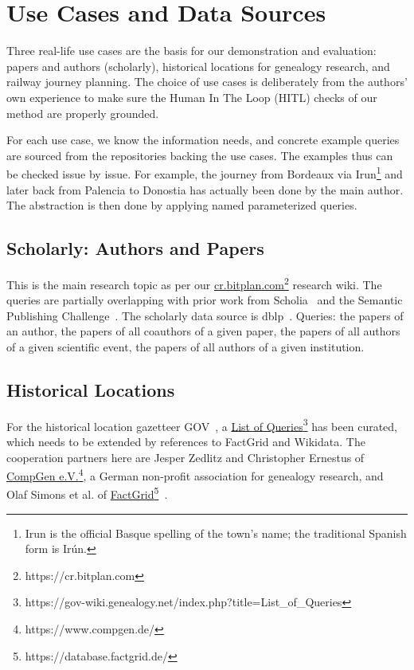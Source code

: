 \documentclass[
]{ceurart}
\newcommand{\footnotelink}[2]{\href{#1}{#2}\footnote{#1}}
\begin{document}
\section{Use Cases and Data Sources}\label{sec:datasources}
Three real-life use cases are the basis for our demonstration and evaluation: papers and authors (scholarly), historical locations for genealogy research, and railway journey planning. 
The choice of use cases is deliberately from the authors' own experience to make sure
the Human In The Loop (HITL) checks of our method are properly grounded.

For each use case, we know the information needs, and concrete example queries are sourced from
the repositories backing the use cases. The examples thus can be checked issue by issue. For example, the journey from Bordeaux via Irun\footnote{Irun is the official Basque spelling of the town's name; the traditional Spanish form is Irún.} and later back from Palencia to Donostia has actually been done by the main author. The abstraction is then done by applying named parameterized queries.

\subsection{Scholarly: Authors and Papers}
This is the main research topic as per our \footnotelink{https://cr.bitplan.com}{cr.bitplan.com} research wiki. The queries are partially overlapping with prior work from Scholia~\cite{nielsen2017scholia} and the Semantic Publishing Challenge~\cite{Lange2014}. The scholarly data source is dblp~\cite{Ley2009}.
Queries: the papers of an author, the papers of all coauthors of a given paper, the papers of all authors of a given scientific event, the papers of all authors of a given institution.
\subsection{Historical Locations}
For the historical location gazetteer GOV~\cite{zedlitz2014modelling}, a \footnotelink{https://gov-wiki.genealogy.net/index.php?title=List\_of\_Queries}{List of Queries}
has been curated, which needs to be extended by references to FactGrid and Wikidata. 
The cooperation partners here are Jesper Zedlitz and Christopher Ernestus of \footnotelink{https://www.compgen.de/}{CompGen e.V.}, a German non-profit association for genealogy research, and Olaf Simons et al. of \footnotelink{https://database.factgrid.de/}{FactGrid}~\cite{factgrid}.
\end{document}
